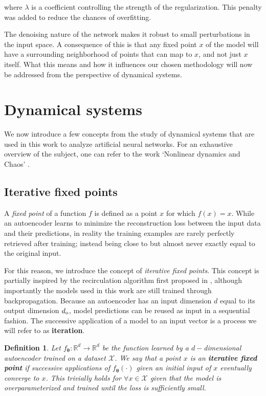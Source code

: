 \documentclass[11pt]{article}
\newtheorem*{definition}{Definition}
\theoremstyle{remark}
\begin{document}
\noindent where $\lambda$ is a coefficient controlling the strength of the regularization. This penalty was added to reduce the chances of overfitting.

The denoising nature of the network makes it robust to small perturbations in the input space. A consequence of this is that any fixed point $x$ of the model will have a surrounding neighborhood of points that can map to $x$, and not just $x$ itself. What this means and how it influences our chosen methodology will now be addressed from the perspective of dynamical systems.

\section{Dynamical systems}

We now introduce a few concepts from the study of dynamical systems that are used in this work to analyze artificial neural networks. For an exhaustive overview of the subject, one can refer to the work `Nonlinear dynamics and Chaos' \cite{strogatz1994nonlinear}.

\subsection{Iterative fixed points}

A \textit{fixed point} of a function $f$ is defined as a point $x$ for which $f(x) = x$. While an autoencoder learns to minimize the reconstruction loss between the input data and their predictions, in reality the training examples are rarely perfectly retrieved after training; instead being close to but almost never exactly equal to the original input.

For this reason, we introduce the concept of \textit{iterative fixed points}. This concept is partially inspired by the recirculation algorithm first proposed in \cite{hinton1987learning}, although importantly the models used in this work are still trained through backpropagation. Because an autoencoder has an input dimension $d$ equal to its output dimension $d_{\rm o}$, model predictions can be reused as input in a sequential fashion. The successive application of a model to an input vector is a process we will refer to as \textbf{iteration}.

\begin{definition}
  Let $f_{\bm{\theta}} : \mathbb{R}^d \rightarrow \mathbb{R}^d$ be the function learned by a $d-$dimensional autoencoder trained on a dataset $\mathcal{X}$. We say that a point $x$ is an \textbf{iterative fixed point} if successive applications of $f_{\bm{\theta}}(\cdot)$ given an initial input of $x$ eventually converge to $x$. This trivially holds for $\forall x \in \mathcal{X}$ given that the model is overparameterized and trained until the loss is sufficiently small.
\end{definition}
\end{document}

